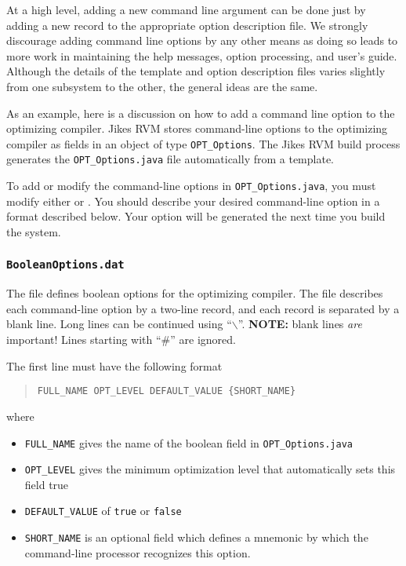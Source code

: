 At a high level, adding a new command line argument can be done just
by adding a new record to the appropriate option description file.  We
strongly discourage adding command line options by any other means as
doing so leads to more work in maintaining the help messages, option
processing, and user's guide. Although the details of the template and
option description files varies slightly from one subsystem to the
other, the general ideas are the same.  

%
As an example, here is a discussion on how to add a command line
option to the optimizing compiler.
Jikes RVM stores command-line options to the optimizing compiler 
as fields in an object of type {\tt OPT\_Options}.
The Jikes RVM build process generates the {\tt OPT\_Options.java} 
file automatically from a template.  

To add or modify the command-line options in {\tt OPT\_Options.java},
you must modify either  or 
.  You should describe your desired
command-line option in a format described below.
Your option will be generated the next time you build the
system.

\subsubsection{\texttt{BooleanOptions.dat}}

The  file defines boolean options for
the optimizing compiler.  The file describes each command-line option 
by a two-line record, and each record is separated
by a blank line.  Long lines can be continued using ``$\backslash$''.
{\bf NOTE:} blank lines {\em are} important!
Lines starting with ``\#'' are ignored.

The first line must have the following format
\begin{quote}
\begin{verbatim}
FULL_NAME OPT_LEVEL DEFAULT_VALUE {SHORT_NAME}
\end{verbatim}
\end{quote}
where
\begin{itemize}
\item {\tt FULL\_NAME} gives the name of the boolean field in {\tt OPT\_Options.java}
\item {\tt OPT\_LEVEL} gives the minimum optimization level that automatically sets this field true
\item {\tt DEFAULT\_VALUE} of {\tt true} or {\tt false}
\item {\tt SHORT\_NAME} is an optional field which defines a mnemonic by which the command-line processor recognizes this option.
\end{itemize}

